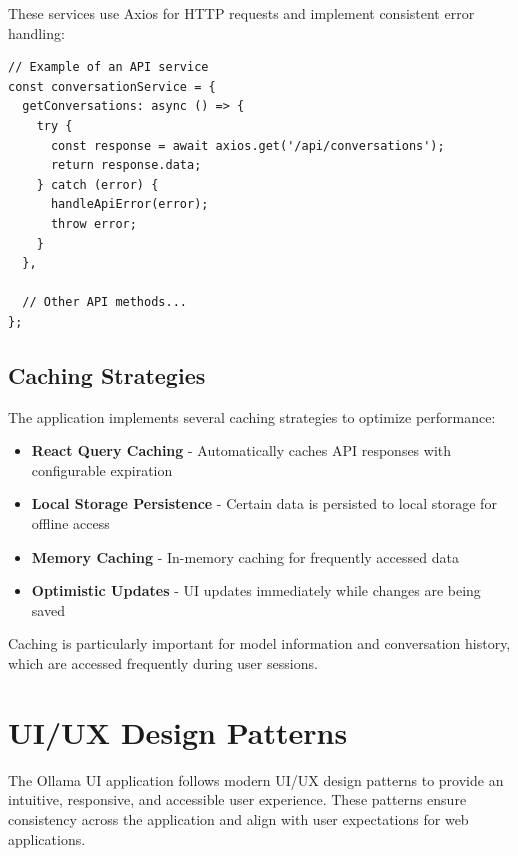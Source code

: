 These services use Axios for HTTP requests and implement consistent error handling:

\begin{verbatim}
// Example of an API service
const conversationService = {
  getConversations: async () => {
    try {
      const response = await axios.get('/api/conversations');
      return response.data;
    } catch (error) {
      handleApiError(error);
      throw error;
    }
  },
  
  // Other API methods...
};
\end{verbatim}

\subsection{Caching Strategies}

The application implements several caching strategies to optimize performance:

\begin{itemize}
  \item \textbf{React Query Caching} - Automatically caches API responses with configurable expiration
  \item \textbf{Local Storage Persistence} - Certain data is persisted to local storage for offline access
  \item \textbf{Memory Caching} - In-memory caching for frequently accessed data
  \item \textbf{Optimistic Updates} - UI updates immediately while changes are being saved
\end{itemize}

Caching is particularly important for model information and conversation history, which are accessed frequently during user sessions.

\section{UI/UX Design Patterns}

The Ollama UI application follows modern UI/UX design patterns to provide an intuitive, responsive, and accessible user experience. These patterns ensure consistency across the application and align with user expectations for web applications.

